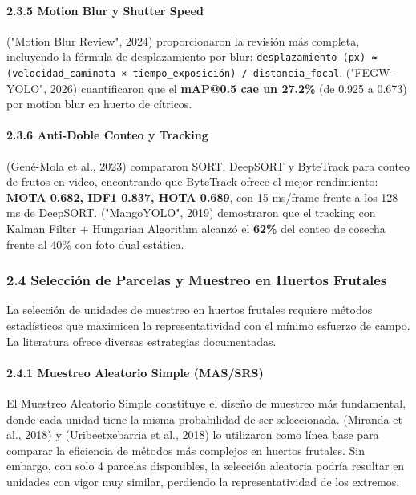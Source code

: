 \paragraph{2.3.5 Motion Blur y Shutter Speed}


("Motion Blur Review", 2024) proporcionaron la revisión más completa, incluyendo la fórmula de desplazamiento por blur: \texttt{desplazamiento (px) ≈ (velocidad\_caminata × tiempo\_exposición) / distancia\_focal}. ("FEGW-YOLO", 2026) cuantificaron que el \textbf{mAP@0.5 cae un 27.2\%} (de 0.925 a 0.673) por motion blur en huerto de cítricos.


\paragraph{2.3.6 Anti-Doble Conteo y Tracking}


(Gené-Mola et al., 2023) compararon SORT, DeepSORT y ByteTrack para conteo de frutos en video, encontrando que ByteTrack ofrece el mejor rendimiento: \textbf{MOTA 0.682, IDF1 0.837, HOTA 0.689}, con 15 ms/frame frente a los 128 ms de DeepSORT. ("MangoYOLO", 2019) demostraron que el tracking con Kalman Filter + Hungarian Algorithm alcanzó el \textbf{62\%} del conteo de cosecha frente al 40\% con foto dual estática.


\subsubsection{2.4 Selección de Parcelas y Muestreo en Huertos Frutales}


La selección de unidades de muestreo en huertos frutales requiere métodos estadísticos que maximicen la representatividad con el mínimo esfuerzo de campo. La literatura ofrece diversas estrategias documentadas.


\paragraph{2.4.1 Muestreo Aleatorio Simple (MAS/SRS)}


El Muestreo Aleatorio Simple constituye el diseño de muestreo más fundamental, donde cada unidad tiene la misma probabilidad de ser seleccionada. (Miranda et al., 2018) y (Uribeetxebarria et al., 2018) lo utilizaron como línea base para comparar la eficiencia de métodos más complejos en huertos frutales. Sin embargo, con solo 4 parcelas disponibles, la selección aleatoria podría resultar en unidades con vigor muy similar, perdiendo la representatividad de los extremos.



